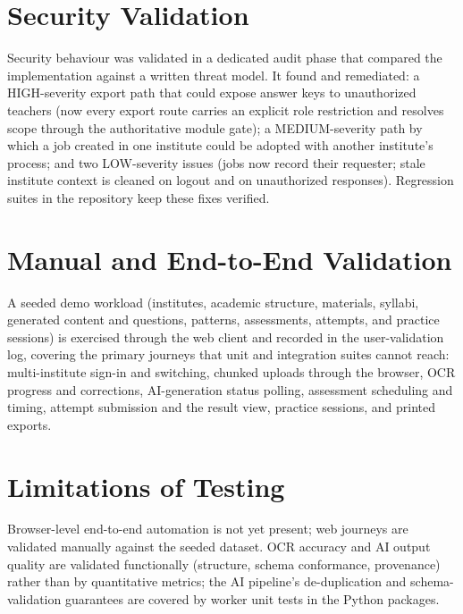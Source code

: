 \section{Security Validation}

\noindent Security behaviour was validated in a dedicated audit phase that
compared the implementation against a written threat model. It found and
remediated: a HIGH-severity export path that could expose answer keys to
unauthorized teachers (now every export route carries an explicit role
restriction and resolves scope through the authoritative module gate); a
MEDIUM-severity path by which a job created in one institute could be adopted
with another institute's process; and two LOW-severity issues (jobs now record
their requester; stale institute context is cleaned on logout and on
unauthorized responses). Regression suites in the repository keep these fixes
verified.

\section{Manual and End-to-End Validation}

\noindent A seeded demo workload (institutes, academic structure, materials,
syllabi, generated content and questions, patterns, assessments, attempts, and
practice sessions) is exercised through the web client and recorded in the
user-validation log, covering the primary journeys that unit and integration
suites cannot reach: multi-institute sign-in and switching, chunked uploads
through the browser, OCR progress and corrections, AI-generation status
polling, assessment scheduling and timing, attempt submission and the result
view, practice sessions, and printed exports.

\section{Limitations of Testing}

\noindent Browser-level end-to-end automation is not yet present; web
journeys are validated manually against the seeded dataset. OCR accuracy and
AI output quality are validated functionally (structure, schema conformance,
provenance) rather than by quantitative metrics; the AI pipeline's
de-duplication and schema-validation guarantees are covered by worker
unit tests in the Python packages.